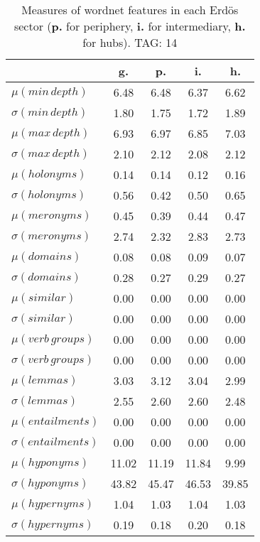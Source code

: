 \begin{table}[h!]
\begin{center}
\begin{tabular}{| l || c | c | c | c |}\hline
 & {\bf g.} & {\bf p.} & {\bf i.} & {\bf h.} \\\hline\hline
$\mu(min\,depth)$ & 6.48  & 6.48  & 6.37  & 6.62 \\
$\sigma(min\,depth)$ & 1.80  & 1.75  & 1.72  & 1.89 \\\hline
$\mu(max\,depth)$ & 6.93  & 6.97  & 6.85  & 7.03 \\
$\sigma(max\,depth)$ & 2.10  & 2.12  & 2.08  & 2.12 \\\hline
$\mu(holonyms)$ & 0.14  & 0.14  & 0.12  & 0.16 \\
$\sigma(holonyms)$ & 0.56  & 0.42  & 0.50  & 0.65 \\\hline
$\mu(meronyms)$ & 0.45  & 0.39  & 0.44  & 0.47 \\
$\sigma(meronyms)$ & 2.74  & 2.32  & 2.83  & 2.73 \\\hline
$\mu(domains)$ & 0.08  & 0.08  & 0.09  & 0.07 \\
$\sigma(domains)$ & 0.28  & 0.27  & 0.29  & 0.27 \\\hline
$\mu(similar)$ & 0.00  & 0.00  & 0.00  & 0.00 \\
$\sigma(similar)$ & 0.00  & 0.00  & 0.00  & 0.00 \\\hline
$\mu(verb\,groups)$ & 0.00  & 0.00  & 0.00  & 0.00 \\
$\sigma(verb\,groups)$ & 0.00  & 0.00  & 0.00  & 0.00 \\\hline
$\mu(lemmas)$ & 3.03  & 3.12  & 3.04  & 2.99 \\
$\sigma(lemmas)$ & 2.55  & 2.60  & 2.60  & 2.48 \\\hline
$\mu(entailments)$ & 0.00  & 0.00  & 0.00  & 0.00 \\
$\sigma(entailments)$ & 0.00  & 0.00  & 0.00  & 0.00 \\\hline
$\mu(hyponyms)$ & 11.02  & 11.19  & 11.84  & 9.99 \\
$\sigma(hyponyms)$ & 43.82  & 45.47  & 46.53  & 39.85 \\\hline
$\mu(hypernyms)$ & 1.04  & 1.03  & 1.04  & 1.03 \\
$\sigma(hypernyms)$ & 0.19  & 0.18  & 0.20  & 0.18 \\\hline
\end{tabular}
\caption{Measures of wordnet features in each Erd\"os sector ({{\bf p.}} for periphery, {{\bf i.}} for intermediary, {{\bf h.}} for hubs). TAG: 14}
\end{center}
\end{table}